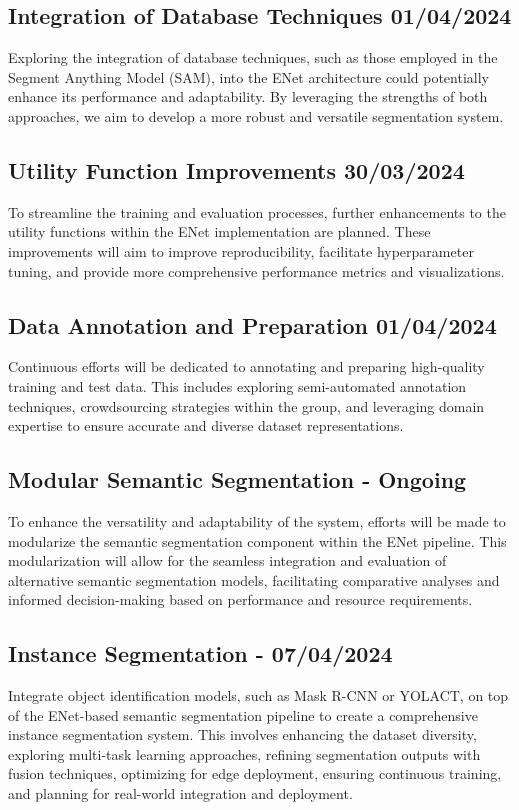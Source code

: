 \subsection{Integration of Database Techniques 01/04/2024}
Exploring the integration of database techniques, such as those employed in the Segment Anything Model (SAM), into the ENet architecture could potentially enhance its performance and adaptability. By leveraging the strengths of both approaches, we aim to develop a more robust and versatile segmentation system.
\subsection{Utility Function Improvements 30/03/2024}
To streamline the training and evaluation processes, further enhancements to the utility functions within the ENet implementation are planned. These improvements will aim to improve reproducibility, facilitate hyperparameter tuning, and provide more comprehensive performance metrics and visualizations.
\subsection{Data Annotation and Preparation 01/04/2024}
Continuous efforts will be dedicated to annotating and preparing high-quality training and test data. This includes exploring semi-automated annotation techniques, crowdsourcing strategies within the group, and leveraging domain expertise to ensure accurate and diverse dataset representations.
\subsection{Modular Semantic Segmentation - Ongoing}
To enhance the versatility and adaptability of the system, efforts will be made to modularize the semantic segmentation component within the ENet pipeline. This modularization will allow for the seamless integration and evaluation of alternative semantic segmentation models, facilitating comparative analyses and informed decision-making based on performance and resource requirements.

\subsection{Instance Segmentation - 07/04/2024}
Integrate object identification models, such as Mask R-CNN or YOLACT, on top of the ENet-based semantic segmentation pipeline to create a comprehensive instance segmentation system. This involves enhancing the dataset diversity, exploring multi-task learning approaches, refining segmentation outputs with fusion techniques, optimizing for edge deployment, ensuring continuous training, and planning for real-world integration and deployment.

